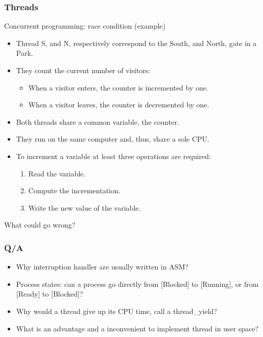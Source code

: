   \begin{frame}
    \frametitle{Threads}
        \begin{block}{Concurrent programming: race condition (example)}
          \begin{itemize}
            \item Thread S, and N, respectively correspond to the South, and North, gate in a Park.
            \item They count the current number of visitors:
            \begin{itemize}
              \item When a visitor enters, the counter is incremented by one.
              \item When a visitor leaves, the counter is decremented by one.
            \end{itemize}
            \item Both threads share a common variable, the counter.
            \item They run on the same computer and, thus, share a sole CPU.
            \item To increment a variable at least three operations are required:
            \begin{enumerate}
              \item Read the variable.
              \item Compute the incrementation.
              \item Write the new value of the variable.
            \end{enumerate}
          \end{itemize}
        \end{block}
	What could go wrong?
  \end{frame}

  \begin{frame}
    \frametitle{Q/A}
    \begin{itemize}
        \item Why interruption handler are usually written in ASM? %
        \item Process states: can a process go directly from [Blocked] to [Running], or from [Ready] to [Blocked]? %
        \item Why would a thread give up its CPU time, call a thread\_yield? %
        \item What is an advantage and a inconvenient to implement thread in user space? %
    \end{itemize}
  \end{frame}
